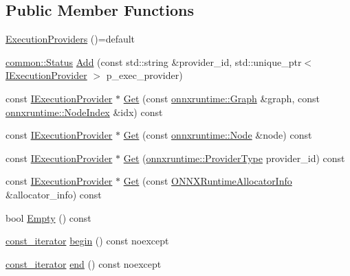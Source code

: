 \subsection*{Public Member Functions}
\begin{DoxyCompactItemize}
\item 
\mbox{\hyperlink{classonnxruntime_1_1ExecutionProviders_a52b3a1bd0ae86e36699450a2c79f2775}{Execution\+Providers}} ()=default
\item 
\mbox{\hyperlink{classonnxruntime_1_1common_1_1Status}{common\+::\+Status}} \mbox{\hyperlink{classonnxruntime_1_1ExecutionProviders_a9e714cc865dbb18293020db7a372bb89}{Add}} (const std\+::string \&provider\+\_\+id, std\+::unique\+\_\+ptr$<$ \mbox{\hyperlink{classonnxruntime_1_1IExecutionProvider}{I\+Execution\+Provider}} $>$ p\+\_\+exec\+\_\+provider)
\item 
const \mbox{\hyperlink{classonnxruntime_1_1IExecutionProvider}{I\+Execution\+Provider}} $\ast$ \mbox{\hyperlink{classonnxruntime_1_1ExecutionProviders_aa824632f2f7215f2087e8b061d054663}{Get}} (const \mbox{\hyperlink{classonnxruntime_1_1Graph}{onnxruntime\+::\+Graph}} \&graph, const \mbox{\hyperlink{namespaceonnxruntime_af8773b5c12b5d8fd9292eb2e268df760}{onnxruntime\+::\+Node\+Index}} \&idx) const
\item 
const \mbox{\hyperlink{classonnxruntime_1_1IExecutionProvider}{I\+Execution\+Provider}} $\ast$ \mbox{\hyperlink{classonnxruntime_1_1ExecutionProviders_a41c2494ae4373f44ebf8f98f83e293cc}{Get}} (const \mbox{\hyperlink{classonnxruntime_1_1Node}{onnxruntime\+::\+Node}} \&node) const
\item 
const \mbox{\hyperlink{classonnxruntime_1_1IExecutionProvider}{I\+Execution\+Provider}} $\ast$ \mbox{\hyperlink{classonnxruntime_1_1ExecutionProviders_a9545ef8343f02280aa5871579576c8ba}{Get}} (\mbox{\hyperlink{namespaceonnxruntime_a863e2227cbf32aab76aad35fdadff4bb}{onnxruntime\+::\+Provider\+Type}} provider\+\_\+id) const
\item 
const \mbox{\hyperlink{classonnxruntime_1_1IExecutionProvider}{I\+Execution\+Provider}} $\ast$ \mbox{\hyperlink{classonnxruntime_1_1ExecutionProviders_a65c0368906fb2431bffe5a81fb5ea5b2}{Get}} (const \mbox{\hyperlink{structONNXRuntimeAllocatorInfo}{O\+N\+N\+X\+Runtime\+Allocator\+Info}} \&allocator\+\_\+info) const
\item 
bool \mbox{\hyperlink{classonnxruntime_1_1ExecutionProviders_a9294aa2a1de0a08b678adbd614b3a3b1}{Empty}} () const
\item 
\mbox{\hyperlink{classonnxruntime_1_1ExecutionProviders_a2eb06c44e805e428aa26b1bfe12348fb}{const\+\_\+iterator}} \mbox{\hyperlink{classonnxruntime_1_1ExecutionProviders_a38333c56526aab3fa4686eb6f8f9db26}{begin}} () const noexcept
\item 
\mbox{\hyperlink{classonnxruntime_1_1ExecutionProviders_a2eb06c44e805e428aa26b1bfe12348fb}{const\+\_\+iterator}} \mbox{\hyperlink{classonnxruntime_1_1ExecutionProviders_a7ef8bcdee18b9ff7e59141171cb79ed3}{end}} () const noexcept
\end{DoxyCompactItemize}


